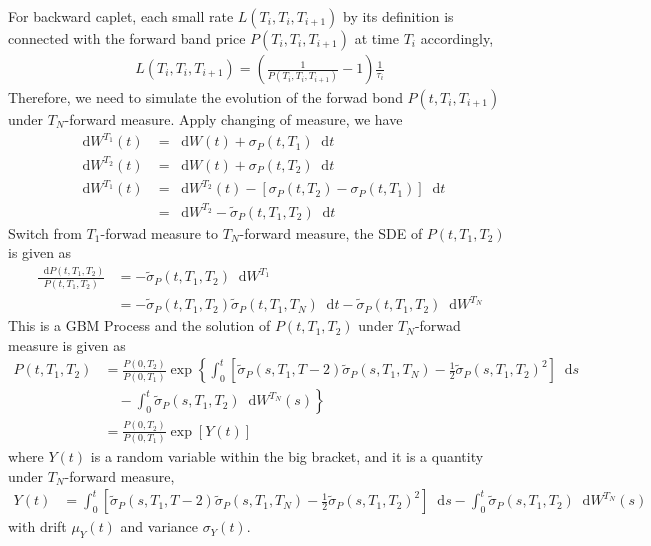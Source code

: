\documentclass[12pt]{article}
\newcommand{\dd}{\mathop{}\!\text{d}}
\newcommand{\sigmaP}{\sigma_P}
\newcommand{\sigmaFP}{\tilde{\sigma}_P}
\newcommand{\half}{\frac{1}{2}}
\begin{document}
For backward caplet, each small rate $L(T_i, T_i, T_{i+1})$ by its definition is
connected with the forward band price $P(T_i, T_i, T_{i+1})$
at time $T_i$ accordingly,
\begin{align}
    L(T_i, T_i, T_{i+1}) = \left(
        \frac{1}{P(T_i, T_i, T_{i+1})} - 1
    \right) \frac{1}{\tau_i}
\end{align}
Therefore, we need to simulate the evolution of the
forwad bond $P(t, T_i, T_{i+1})$ under $T_N$-forward
measure. Apply changing of measure, we have
\begin{align}
   \dd W^{T_1}(t) &= \dd W(t) + \sigmaP(t, T_1) \dd t \\
   \dd W^{T_2}(t) &= \dd W(t) + \sigmaP(t, T_2) \dd t \\
   \dd W^{T_1}(t) &= \dd W^{T_2}(t) - \left[ \sigmaP(t, T_2) - \sigmaP(t, T_1) \right] \dd t\\
    &= \dd W^{T_2} - \sigmaFP(t, T_1, T_2) \dd t
\end{align}
Switch from $T_1$-forwad measure to $T_N$-forward measure,
the SDE of $P(t, T_1, T_2)$ is given as
\begin{align}
    \frac{\dd P(t, T_1, T_2)}{P(t, T_1, T_2)}
        &= -\sigmaFP(t, T_1, T_2) \dd W^{T_1} \\
        &= -\sigmaFP(t, T_1, T_2) \sigmaFP(t, T_1, T_N) \dd t - \sigmaFP(t, T_1, T_2) \dd W^{T_N}
\end{align}
This is a GBM Process and the solution of $P(t, T_1, T_2)$
under $T_N$-forwad measure is given as
\begin{align}
    P(t, T_1, T_2) &= \frac{P(0, T_2)}{P(0, T_1)}
    \exp \left\{
        \int_0^t \left[
            \sigmaFP(s, T_1, T-2) \sigmaFP(s, T_1, T_N)
            - \half \sigmaFP(s, T_1, T_2)^2
        \right] \dd s \right. \\
        &\left. \quad
            - \int_0^t \sigmaFP(s, T_1, T_2) \dd W^{T_N}(s)
    \right\} \\
    &=\frac{P(0, T_2)}{P(0, T_1)} \exp \left[Y(t)\right]
\end{align}
where $Y(t)$ is a random variable within the big bracket,
and it is a quantity under $T_N$-forward measure,
\begin{align}
    Y(t) &=
         \int_0^t \left[
            \sigmaFP(s, T_1, T-2) \sigmaFP(s, T_1, T_N)
            - \half \sigmaFP(s, T_1, T_2)^2
        \right] \dd s 
            - \int_0^t \sigmaFP(s, T_1, T_2) \dd W^{T_N}(s)
\end{align}
with drift $\mu_{Y}(t)$ and variance $\sigma_{Y}(t)$.
\end{document}

